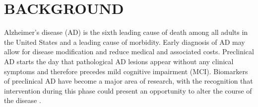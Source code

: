 \documentclass[review,3p,times,12pt,letterpaper]{elsarticle}
\begin{document}

\section*{BACKGROUND}
\label{sec:intro}

Alzheimer’s disease (AD) is the sixth leading cause of death among all adults in the United States and a leading cause of morbidity. Early diagnosis of AD may allow for disease modification and reduce medical and associated costs. Preclinical AD \cite{sperling_toward_2011} starts the day that pathological AD lesions appear without any clinical symptoms \cite{dubois_preclinical_2016} and therefore precedes mild cognitive impairment (MCI). Biomarkers of preclinical AD have become a major area of research, with the recognition that intervention during this phase could present an opportunity to alter the course of the disease \cite{parnetti_prevalence_2019}. 
\end{document}
